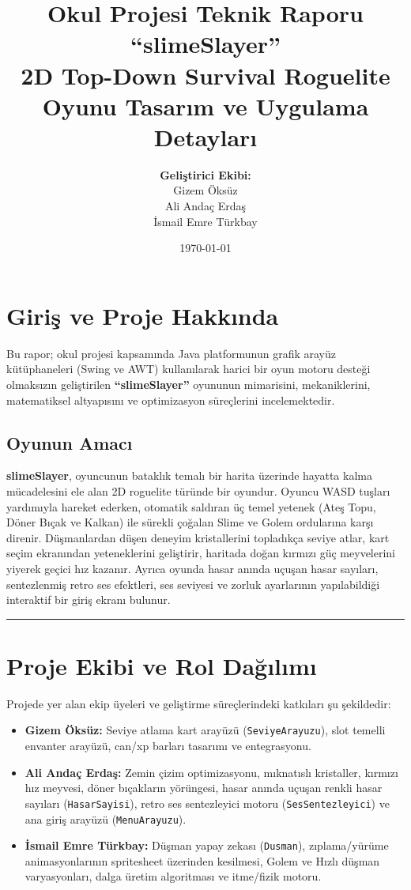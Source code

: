 \documentclass[12pt]{article}
\title{
    \vspace{-2cm}
    \textbf{\Large Okul Projesi Teknik Raporu}\\
    \vspace{0.5cm}
    \textbf{\huge ``slimeSlayer''}\\
    \vspace{0.5cm}
    \large 2D Top-Down Survival Roguelite Oyunu Tasarım ve Uygulama Detayları
}
\author{
    \textbf{Geliştirici Ekibi:}\\
    Gizem Öksüz \\
    Ali Andaç Erdaş \\
    İsmail Emre Türkbay
}
\date{\today}
\begin{document}
\maketitle
\newpage
\tableofcontents
\newpage

\section{Giriş ve Proje Hakkında}
Bu rapor; okul projesi kapsamında Java platformunun grafik arayüz kütüphaneleri (Swing ve AWT) kullanılarak harici bir oyun motoru desteği olmaksızın geliştirilen \textbf{``slimeSlayer''} oyununun mimarisini, mekaniklerini, matematiksel altyapısını ve optimizasyon süreçlerini incelemektedir.

\subsection{Oyunun Amacı}
\textbf{slimeSlayer}, oyuncunun bataklık temalı bir harita üzerinde hayatta kalma mücadelesini ele alan 2D roguelite türünde bir oyundur. Oyuncu WASD tuşları yardımıyla hareket ederken, otomatik saldıran üç temel yetenek (Ateş Topu, Döner Bıçak ve Kalkan) ile sürekli çoğalan Slime ve Golem ordularına karşı direnir. Düşmanlardan düşen deneyim kristallerini topladıkça seviye atlar, kart seçim ekranından yeteneklerini geliştirir, haritada doğan kırmızı güç meyvelerini yiyerek geçici hız kazanır. Ayrıca oyunda hasar anında uçuşan hasar sayıları, sentezlenmiş retro ses efektleri, ses seviyesi ve zorluk ayarlarının yapılabildiği interaktif bir giriş ekranı bulunur.

\bigskip
\hrule
\bigskip

\section{Proje Ekibi ve Rol Dağılımı}
Projede yer alan ekip üyeleri ve geliştirme süreçlerindeki katkıları şu şekildedir:
\begin{itemize}
    \item \textbf{Gizem Öksüz:} Seviye atlama kart arayüzü (\texttt{SeviyeArayuzu}), slot temelli envanter arayüzü, can/xp barları tasarımı ve entegrasyonu.
    \item \textbf{Ali Andaç Erdaş:} Zemin çizim optimizasyonu, mıknatıslı kristaller, kırmızı hız meyvesi, döner bıçakların yörüngesi, hasar anında uçuşan renkli hasar sayıları (\texttt{HasarSayisi}), retro ses sentezleyici motoru (\texttt{SesSentezleyici}) ve ana giriş arayüzü (\texttt{MenuArayuzu}).
    \item \textbf{İsmail Emre Türkbay:} Düşman yapay zekası (\texttt{Dusman}), zıplama/yürüme animasyonlarının spritesheet üzerinden kesilmesi, Golem ve Hızlı düşman varyasyonları, dalga üretim algoritması ve itme/fizik motoru.
\end{itemize}
\end{document}
